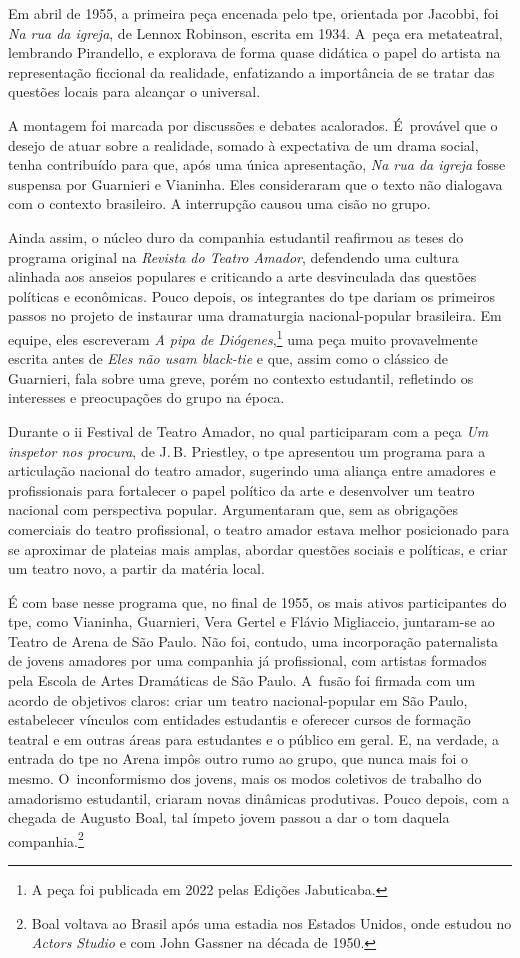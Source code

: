 Em abril de 1955, a primeira peça encenada pelo {\sc tpe}, orientada por
Jacobbi, foi {\it Na rua da igreja}, de Lennox Robinson, escrita em
1934. A~peça era metateatral, lembrando Pirandello, e explorava de forma
quase didática o papel do artista na representação ficcional da
realidade, enfatizando a importância de se tratar das questões locais
para alcançar o universal.

A montagem foi marcada por discussões e debates acalorados. É~provável
que o desejo de atuar sobre a realidade, somado à expectativa de um
drama social, tenha contribuído para que, após uma única apresentação,
{\it Na rua da igreja} fosse suspensa por Guarnieri e Vianinha. Eles
consideraram que o texto não dialogava com o contexto brasileiro. A
interrupção causou uma cisão no grupo.

Ainda assim, o núcleo duro da companhia estudantil reafirmou as teses do
programa original na {\it Revista do Teatro Amador}, defendendo uma cultura
alinhada aos anseios populares e criticando a arte desvinculada das
questões políticas e econômicas. Pouco depois, os integrantes do {\sc tpe}
dariam os primeiros passos no projeto de instaurar uma dramaturgia
nacional-popular brasileira. Em equipe, eles escreveram {\it A pipa de
Diógenes},\footnote{A peça foi publicada em 2022 pelas Edições Jabuticaba.} uma peça muito provavelmente escrita antes de {\it Eles não
usam black-tie} e que, assim como o clássico de Guarnieri, fala sobre
uma greve, porém no contexto estudantil, refletindo os interesses e
preocupações do grupo na época.

Durante o {\sc ii} Festival de Teatro Amador, no qual participaram com a peça
{\it Um inspetor nos procura}, de J.\,B. Priestley, o {\sc tpe} apresentou um
programa para a articulação nacional do teatro amador, sugerindo uma
aliança entre amadores e profissionais para fortalecer o papel político
da arte e desenvolver um teatro nacional com perspectiva popular.
Argumentaram que, sem as obrigações comerciais do teatro profissional, o
teatro amador estava melhor posicionado para se aproximar de plateias
mais amplas, abordar questões sociais e políticas, e criar um teatro
novo, a partir da matéria local.

É com base nesse programa que, no final de 1955, os mais ativos
participantes do {\sc tpe}, como Vianinha, Guarnieri, Vera Gertel e Flávio
Migliaccio, juntaram-se ao Teatro de Arena de São Paulo. Não foi,
contudo, uma incorporação paternalista de jovens amadores por uma
companhia já profissional, com artistas formados pela Escola de Artes
Dramáticas de São Paulo. A~fusão foi firmada com um acordo de objetivos
claros: criar um teatro nacional-popular em São Paulo, estabelecer
vínculos com entidades estudantis e oferecer cursos de formação teatral
e em outras áreas para estudantes e o público em geral. E, na verdade, a
entrada do {\sc tpe} no Arena impôs outro rumo ao grupo, que nunca mais foi o
mesmo. O~inconformismo dos jovens, mais os modos coletivos de trabalho
do amadorismo estudantil, criaram novas dinâmicas produtivas. Pouco
depois, com a chegada de Augusto Boal, tal ímpeto jovem passou a
dar o tom daquela companhia.\footnote{Boal voltava ao Brasil após uma
  estadia nos Estados Unidos, onde estudou no {\it Actors Studio} e com John
  Gassner na década de 1950.}

